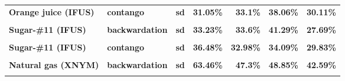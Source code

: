 \documentclass[
  authoryear,
  preprint,
  3p]{elsarticle}
\begin{document}
\begin{longtable}[t]{>{}l>{}l>{}l>{}r>{}r>{}r>{}r}
\addlinespace
\textbf{Orange juice (IFUS)} & \textbf{contango} & \textbf{sd} & \textcolor[HTML]{4285f4}{\textbf{31.05\%}} & \textcolor[HTML]{4285f4}{\textbf{33.1\%}} & \textcolor[HTML]{4285f4}{\textbf{38.06\%}} & \textcolor[HTML]{4285f4}{\textbf{30.11\%}}\\
\textbf{\cellcolor{gray!10}{Sugar-\#11 (IFUS)}} & \textbf{\cellcolor{gray!10}{backwardation}} & \textbf{\cellcolor{gray!10}{mean}} & \textcolor[HTML]{4285f4}{\textbf{\cellcolor{gray!10}{11.98\%}}} & \textcolor[HTML]{4285f4}{\textbf{\cellcolor{gray!10}{29.51\%}}} & \textcolor[HTML]{4285f4}{\textbf{\cellcolor{gray!10}{2.7\%}}} & \textcolor[HTML]{4285f4}{\textbf{\cellcolor{gray!10}{-8.07\%}}}\\
\textbf{Sugar-\#11 (IFUS)} & \textbf{backwardation} & \textbf{sd} & \textcolor[HTML]{4285f4}{\textbf{33.23\%}} & \textcolor[HTML]{4285f4}{\textbf{33.6\%}} & \textcolor[HTML]{4285f4}{\textbf{41.29\%}} & \textcolor[HTML]{4285f4}{\textbf{27.69\%}}\\
\textbf{\cellcolor{gray!10}{Sugar-\#11 (IFUS)}} & \textbf{\cellcolor{gray!10}{contango}} & \textbf{\cellcolor{gray!10}{mean}} & \textcolor[HTML]{4285f4}{\textbf{\cellcolor{gray!10}{-20.49\%}}} & \textcolor[HTML]{4285f4}{\textbf{\cellcolor{gray!10}{20.35\%}}} & \textcolor[HTML]{4285f4}{\textbf{\cellcolor{gray!10}{21.47\%}}} & \textcolor[HTML]{4285f4}{\textbf{\cellcolor{gray!10}{4.7\%}}}\\
\textbf{Sugar-\#11 (IFUS)} & \textbf{contango} & \textbf{sd} & \textcolor[HTML]{4285f4}{\textbf{36.48\%}} & \textcolor[HTML]{4285f4}{\textbf{32.98\%}} & \textcolor[HTML]{4285f4}{\textbf{34.09\%}} & \textcolor[HTML]{4285f4}{\textbf{29.83\%}}\\
\addlinespace
\textbf{\cellcolor{gray!10}{Natural gas (XNYM)}} & \textbf{\cellcolor{gray!10}{backwardation}} & \textbf{\cellcolor{gray!10}{mean}} & \textcolor[HTML]{4285f4}{\textbf{\cellcolor{gray!10}{**85.84\%}}} & \textcolor[HTML]{4285f4}{\textbf{\cellcolor{gray!10}{4.76\%}}} & \textcolor[HTML]{4285f4}{\textbf{\cellcolor{gray!10}{-2.32\%}}} & \textcolor[HTML]{4285f4}{\textbf{\cellcolor{gray!10}{18.33\%}}}\\
\textbf{Natural gas (XNYM)} & \textbf{backwardation} & \textbf{sd} & \textcolor[HTML]{4285f4}{\textbf{63.46\%}} & \textcolor[HTML]{4285f4}{\textbf{47.3\%}} & \textcolor[HTML]{4285f4}{\textbf{48.85\%}} & \textcolor[HTML]{4285f4}{\textbf{42.59\%}}\\
\textbf{\cellcolor{gray!10}{Natural gas (XNYM)}} & \textbf{\cellcolor{gray!10}{contango}} & \textbf{\cellcolor{gray!10}{mean}} & \textcolor[HTML]{4285f4}{\textbf{\cellcolor{gray!10}{-11.98\%}}} & \textcolor[HTML]{4285f4}{\textbf{\cellcolor{gray!10}{27.84\%}}} & \textcolor[HTML]{4285f4}{\textbf{\cellcolor{gray!10}{4.77\%}}} & \textcolor[HTML]{4285f4}{\textbf{\cellcolor{gray!10}{3.25\%}}}\\

\end{longtable}
\end{document}
